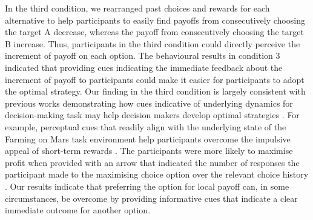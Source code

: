 \documentclass[twocolumn]{article}
\begin{document}
In the third condition, we rearranged past choices and rewards for
each alternative to help participants to easily find payoffs from
consecutively choosing the target A decrease, whereas the payoff from
consecutively choosing the target B increase. Thus, participants in
the third condition could directly perceive the increment of payoff on
each option. The behavioural results in condition 3 indicated that
providing cues indicating the immediate feedback about the increment
of payoff to participants could make it easier for participants to
adopt the optimal strategy. Our finding in the third condition is
largely consistent with previous works demonstrating how cues
indicative of underlying dynamics for decision-making task may help
decision makers develop optimal strategies \cite{RN12,RN13,RN28}. For
example, perceptual cues that readily align with the underlying state
of the Farming on Mars task environment help participants overcome the
impulsive appeal of short-term rewards \cite{RN12}. The participants
were more likely to maximise profit when provided with an arrow that
indicated the number of responses the participant made to the
maximising choice option over the relevant choice history
\cite{RN13}. Our results indicate that preferring the option for local
payoff can, in some circumstances, be overcome by providing
informative cues that indicate a clear immediate outcome for another
option.






\bigskip
\end{document}
